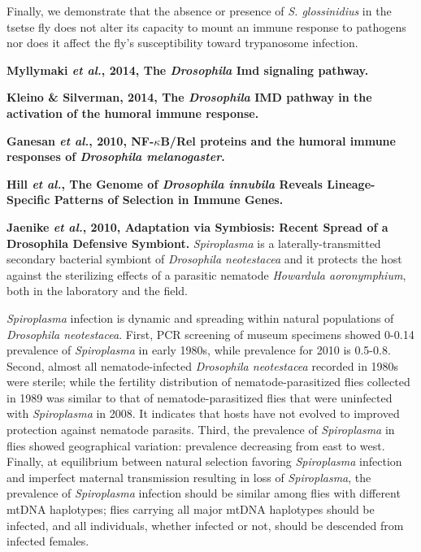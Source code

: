 \documentclass[11pt]{article}
\begin{document}
\begin{sloppypar}
Finally, we demonstrate that the absence or presence of \textit{S. glossinidius} in the tsetse fly does not alter its capacity to mount an immune response to pathogens nor does it affect the fly’s susceptibility toward trypanosome infection.
\par
\textbf{Myllymaki \textit{et al.}, 2014, The \textit{Drosophila} Imd signaling pathway.} \newline
\par
\textbf{Kleino & Silverman, 2014, The \textit{Drosophila} IMD pathway in the activation of the humoral immune response.} \newline
\par
\textbf{Ganesan \textit{et al.}, 2010, NF-$\kappa$B/Rel proteins and the humoral immune responses of \textit{Drosophila melanogaster}.} \newline
\par
\textbf{Hill \textit{et al.}, The Genome of \textit{Drosophila innubila} Reveals Lineage-Specific Patterns of Selection in Immune Genes.} \newline
\par
\textbf{Jaenike \textit{et al.}, 2010, Adaptation via Symbiosis: Recent Spread of a Drosophila Defensive Symbiont.} \newline
\textit{Spiroplasma} is a laterally-transmitted secondary bacterial symbiont of \textit{Drosophila neotestacea} and it protects the host against the sterilizing effects of a parasitic nematode \textit{Howardula aoronymphium}, both in the laboratory and the field. 
\par
\textit{Spiroplasma} infection is dynamic and spreading within natural populations of \textit{Drosophila neotestacea}. 
First, PCR screening of museum specimens showed 0-0.14 prevalence of \textit{Spiroplasma} in early 1980s, while prevalence for 2010 is 0.5-0.8. 
Second, almost all nematode-infected \textit{Drosophila neotestacea} recorded in 1980s were sterile; while the fertility distribution of nematode-parasitized flies collected in 1989 was similar to that of nematode-parasitized flies that were uninfected with \textit{Spiroplasma} in 2008. 
It indicates that hosts have not evolved to improved protection against nematode parasits. 
Third, the prevalence of \textit{Spiroplasma} in flies showed geographical variation: prevalence decreasing from east to west. 
Finally, at equilibrium between natural selection favoring \textit{Spiroplasma} infection and imperfect maternal transmission resulting in loss of \textit{Spiroplasma}, the prevalence of \textit{Spiroplasma} infection should be similar among flies with different mtDNA haplotypes; flies carrying all major mtDNA haplotypes should be infected, and all individuals, whether infected or not, should be descended from infected females. 

\end{sloppypar}
\end{document}
